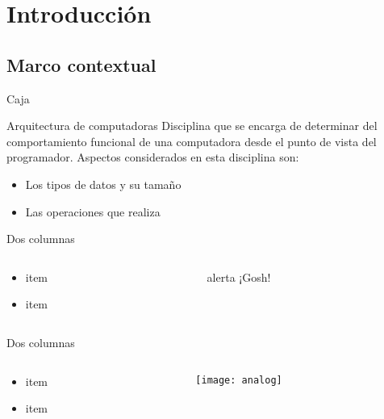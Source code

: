 \section{Introducción}

\subsection{Marco contextual}

\begin{frame}{Caja}
   \begin{Block}{Arquitectura de computadoras}
      Disciplina que se encarga de determinar del comportamiento funcional de una computadora desde el punto de vista del programador. Aspectos considerados en esta disciplina son:
   \begin{itemize}
      \item Los tipos de datos y su tamaño
      \item Las operaciones que realiza
   \end{itemize}
   \end{Block}
\end{frame}

\begin{frame}{Dos columnas}
\begin{columns}
   \begin{column}{0.48\textwidth}
      \begin{itemize}
         \item item
         \item item
      \end{itemize}
   \end{column}
   \hfill
   \begin{column}{0.48\textwidth}
      \begin{AlertBlock}{alerta}
         ¡Gosh!
      \end{AlertBlock}
   \end{column}
\end{columns}
\end{frame}

\begin{frame}{Dos columnas}
   \begin{columns}
      \begin{column}{0.48\textwidth}
         \begin{itemize}
            \item item
            \item item
         \end{itemize}
      \end{column}
      \hfill
      \begin{column}{0.48\textwidth}
         \centering
         \texttt{[image: analog]}
      \end{column}
   \end{columns}
\end{frame}

